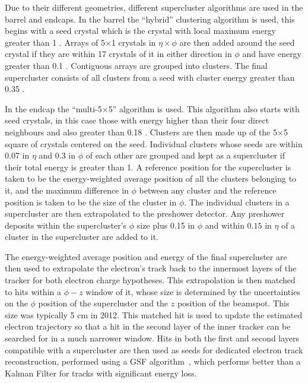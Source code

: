 Due to their different geometries, different supercluster algorithms are used in the barrel and endcaps. In the barrel the ``hybrid'' clustering algorithm is used, this begins with a seed crystal which is the crystal with local maximum energy greater than 1 \GeV. Arrays of 5$\times$1 crystals in $\eta\times\phi$ are then added around the seed crystal if they are within 17 crystals of it in either direction in $\phi$ and have energy greater than 0.1 \GeV. Contiguous arrays are grouped into clusters. The final supercluster consists of all clusters from a seed with cluster energy greater than 0.35 \GeV.

In the endcap the ``multi-5$\times$5'' algorithm is used. This algorithm also starts with seed crystals, in this case those with energy higher than their four direct neighbours and also greater than 0.18 \GeV. Clusters are then made up of the 5$\times$5 square of crystals centered on the seed. Individual clusters whose seeds are within 0.07 in $\eta$ and 0.3 in $\phi$ of each other are grouped and kept as a supercluster if their total energy is greater than 1\GeV. A reference position for the supercluster is taken to be the energy-weighted average position of all the clusters belonging to it, and the maximum difference in $\phi$ between any cluster and the reference position is taken to be the size of the cluster in $\phi$. The individual clusters in a supercluster are then extrapolated to the preshower detector. Any preshower deposits within the supercluster's $\phi$ size plus 0.15 in $\phi$ and within $0.15$ in $\eta$ of a cluster in the supercluster are added to it.

The energy-weighted average position and energy of the final supercluster are then used to extrapolate the electron's track back to the innermost layers of the tracker for both electron charge hypotheses. This extrapolation is then matched to hits within a $\phi - z$ window of it, whose size is determined by the uncertainties on the $\phi$ position of the supercluster and the $z$ position of the beamspot. This size was typically 5 cm in 2012. This matched hit is used to update the estimated electron trajectory so that a hit in the second layer of the inner tracker can be searched for in a much narrower window. Hits in both the first and second layers compatible with a supercluster are then used as seeds for dedicated electron track reconstruction, performed using a \ac{GSF} algorithm~\cite{GSFalgorithm}, which performs better than a Kalman Filter for tracks with significant energy loss.


